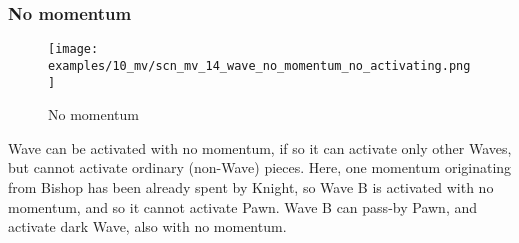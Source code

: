



\clearpage %

\subsubsection*{No momentum}

\vspace*{-3.0ex}
\noindent
\begin{figure}[h]
\texttt{[image: examples/10\_mv/scn\_mv\_14\_wave\_no\_momentum\_no\_activating.png]}
\caption{No momentum}
\label{fig:scn_mv_14_wave_no_momentum_no_activating}
\end{figure}

Wave can be activated with no momentum, if so it can activate only other Waves, but
cannot activate ordinary (non-Wave) pieces. Here, one momentum originating from Bishop
has been already spent by Knight, so Wave B is activated with no momentum, and so it
cannot activate Pawn. Wave B can pass-by Pawn, and activate dark Wave, also with no
momentum.

\clearpage %

